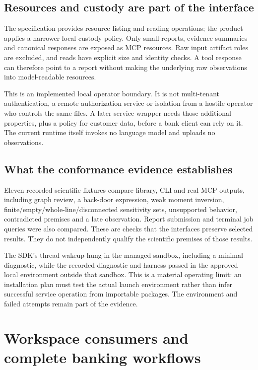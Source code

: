 \section{Resources and custody are part of the interface}

The specification provides resource listing and reading operations; the
product applies a narrower local custody policy.\cite{v12_mcp_legacy_resources}
Only small reports, evidence summaries and canonical responses are exposed as
MCP resources. Raw input artifact roles are excluded, and reads have explicit
size and identity checks. A tool response can therefore point to a report
without making the underlying raw observations into model-readable resources.

This is an implemented local operator boundary. It is not multi-tenant
authentication, a remote authorization service or isolation from a hostile
operator who controls the same files. A later service wrapper needs those
additional properties, plus a policy for customer data, before a bank client
can rely on it. The current runtime itself invokes no language model and
uploads no observations.

\section{What the conformance evidence establishes}

Eleven recorded scientific fixtures compare library, CLI and real MCP outputs,
including graph review, a back-door expression, weak moment inversion,
finite/empty/whole-line/disconnected sensitivity sets, unsupported behavior,
contradicted premises and a late observation. Report submission and terminal
job queries were also compared.\cite{v12_in_runtime} These are checks that the
interfaces preserve selected results. They do not independently qualify the
scientific premises of those results.

The SDK's thread wakeup hung in the managed sandbox, including a minimal
diagnostic, while the recorded diagnostic and harness passed in the approved
local environment outside that sandbox. This is a material operating limit:
an installation plan must test the actual launch environment rather than infer
successful service operation from importable packages. The environment and
failed attempts remain part of the evidence.

\chapter{Workspace consumers and complete banking workflows}
\label{in:consumers}


